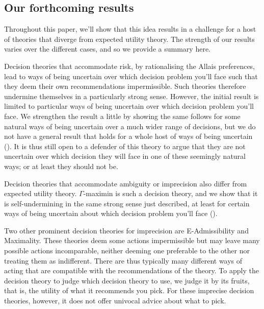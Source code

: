 \documentclass[a4paper]{article}
\renewcommand{\color}[1]{}
\newenvironment{colored}[1]{\leavevmode\color{#1}}{}
\newenvironment{CCM rewritten}
{\begingroup\color{blue}} %
{\endgroup}              %
\begin{document}
\begin{colored}
	{violet}
	\subsection{Our forthcoming results}

	
	
	Throughout this paper, we'll show that this idea results in a challenge for a host of theories that diverge from expected utility theory. The strength of our results varies over the different cases, and so we provide a summary here.
	
	Decision theories that accommodate risk, by rationalising the Allais preferences, lead to ways of being uncertain over which decision problem you'll face such that they deem their own recommendations impermissible. Such theories therefore undermine themselves in a particularly strong sense. However, the initial result is limited to particular ways of being uncertain over which decision problem you'll face. We strengthen the result a little by showing the same follows for some natural ways of being uncertain over a much wider range of decisions, but we do not have a general result that holds for a whole host of ways of being uncertain (). It is thus still open to a defender of this theory to argue that they are not uncertain over which decision they will face in one of these seemingly natural ways; or at least they should not be. 
	
	Decision theories that accommodate ambiguity or imprecision also differ from expected utility theory. $\Gamma$-maximin is such a decision theory, and we show that it is self-undermining in the same strong sense just described, at least for certain ways of being uncertain about which decision problem you'll face ().
	
	Two other prominent decision theories for imprecision are E-Admissibility and Maximality. 	
	These theories deem some actions impermissible but may leave many possible actions incomparable, neither deeming one preferable to the other nor treating them as indifferent. There are thus typically many different ways of acting that are compatible with the recommendations of the theory. 
	To apply the decision theory to judge which decision theory to use, we judge it by its fruits, that is, the utility of what it recommends you pick. For these imprecise decision theories, however, it does not offer univocal advice about what to pick. 
	

\end{colored}
\end{document}
